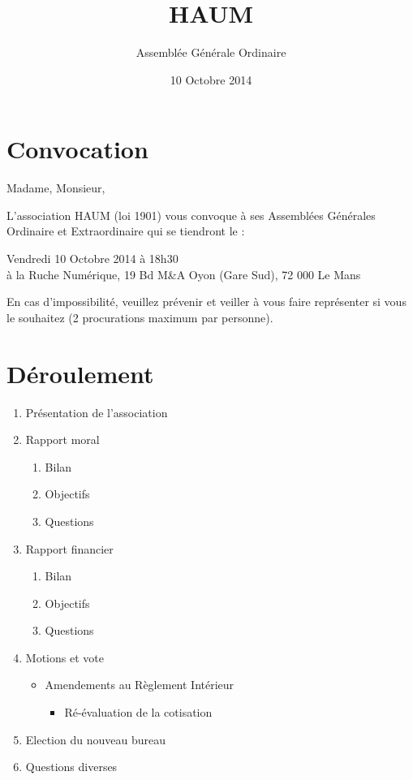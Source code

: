 \documentclass[11pt]{article}
\title{HAUM}
\author{Assemblée Générale Ordinaire}
\date{10 Octobre 2014}
\begin{document}
\maketitle


\section*{Convocation}

Madame, Monsieur, 

L'association HAUM (loi 1901) vous convoque à ses Assemblées Générales Ordinaire et Extraordinaire qui se tiendront le :

\begin{center}
{\Large Vendredi 10 Octobre 2014 à 18h30}\\
à la Ruche Numérique, 19 Bd M\&A Oyon (Gare Sud), 72 000 Le Mans
\end{center}

En cas d'impossibilité, veuillez prévenir et veiller à vous faire représenter si vous le souhaitez (2 procurations maximum par personne).

\section*{Déroulement}

\begin{enumerate}
    \item Présentation de l'association
    \item Rapport moral
        \begin{enumerate}
            \item Bilan
            \item Objectifs
            \item Questions
        \end{enumerate}
    \item Rapport financier
        \begin{enumerate}
            \item Bilan
            \item Objectifs
            \item Questions
        \end{enumerate}
    \item Motions et vote
        \begin{itemize}
            \item Amendements au Règlement Intérieur
			\begin{itemize}
				\item Ré-évaluation de la cotisation
			\end{itemize}
		\end{itemize}
    \item Election du nouveau bureau
    \item Questions diverses
\end{enumerate}
\end{document}
